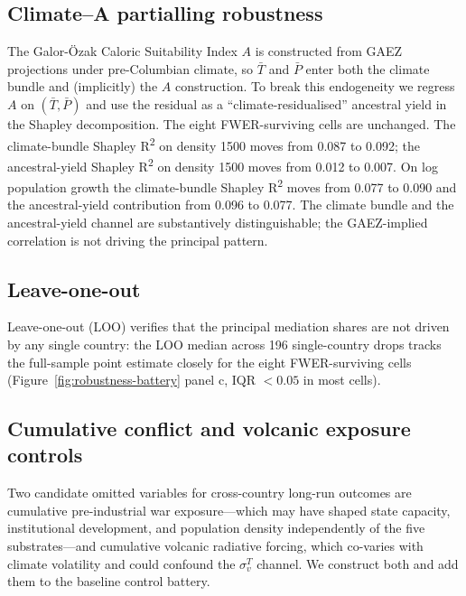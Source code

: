 \documentclass[11pt,letterpaper]{article}
\begin{document}
\subsection{Climate--A partialling robustness}
\label{sec:climate-A-partial}

The Galor-\"Ozak Caloric Suitability Index $A$ is constructed from GAEZ projections under pre-Columbian climate, so $\bar T$ and $\bar P$ enter both the climate bundle and (implicitly) the $A$ construction. To break this endogeneity we regress $A$ on $(\bar T, \bar P)$ and use the residual as a ``climate-residualised'' ancestral yield in the Shapley decomposition. The eight FWER-surviving cells are unchanged. The climate-bundle Shapley R\textsuperscript{2} on density 1500 moves from 0.087 to 0.092; the ancestral-yield Shapley R\textsuperscript{2} on density 1500 moves from 0.012 to 0.007. On log population growth the climate-bundle Shapley R\textsuperscript{2} moves from 0.077 to 0.090 and the ancestral-yield contribution from 0.096 to 0.077. The climate bundle and the ancestral-yield channel are substantively distinguishable; the GAEZ-implied correlation is not driving the principal pattern.

\subsection{Leave-one-out}

Leave-one-out (LOO) verifies that the principal mediation shares are not driven by any single country: the LOO median across 196 single-country drops tracks the full-sample point estimate closely for the eight FWER-surviving cells (Figure~\ref{fig:robustness-battery} panel c, IQR $<0.05$ in most cells).

\subsection{Cumulative conflict and volcanic exposure controls}
\label{sec:conflict-volcanic}

Two candidate omitted variables for cross-country long-run outcomes are cumulative pre-industrial war exposure---which may have shaped state capacity, institutional development, and population density independently of the five substrates---and cumulative volcanic radiative forcing, which co-varies with climate volatility and could confound the $\sigma_v^T$ channel. We construct both and add them to the baseline control battery.
\end{document}
